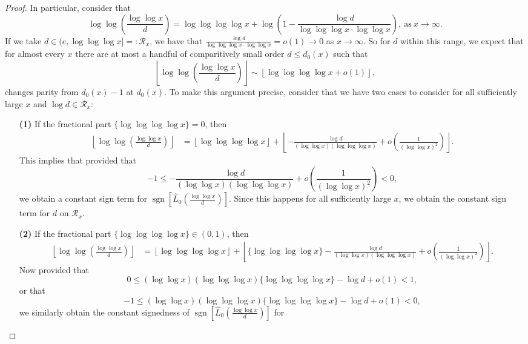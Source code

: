 \documentclass[11pt,reqno,a4letter]{article}
\numberwithin{figure}{section}
\numberwithin{table}{section}
\newcommand{\floor}[1]{\left\lfloor #1 \right\rfloor}
\theoremstyle{plain}
\numberwithin{theorem}{section}
\theoremstyle{definition}
\begin{document}
\begin{proof}
In particular, consider that 
\[
\log\log\left(\frac{\log\log x}{d}\right) = \log\log\log\log x + \log\left(1 - 
     \frac{\log d}{\log\log\log x \cdot \log\log x}\right), \mathrm{\ as\ } x \rightarrow \infty. 
\] 
If we take $d \in (e, \log\log\log x] =: \mathcal{R}_x$, we have that 
$\frac{\log d}{\log\log\log x \cdot \log\log x} = o(1) \rightarrow 0$ as $x \rightarrow \infty$. 
So for $d$ within this range, we expect that for almost every $x$ there are at most 
a handful of comparitively small order $d \leq d_0(x)$ such that 
\[
\floor{\log\log\left(\frac{\log\log x}{d}\right)} \sim \floor{\log\log\log\log x + o(1)}, 
\]
changes parity from $d_0(x)-1$ at $d_0(x)$. To make this argument precise, consider that we have two 
cases to consider for all sufficiently large $x$ and $\log d \in \mathcal{R}_x$: 
\begin{itemize}[itemsep=0pt,topsep=0pt,leftmargin=0.25in]  
\item[\textbf{(1)}] If the fractional part $\{\log\log\log\log x\} = 0$, then 
     \begin{align*} 
     \floor{\log\log\left(\frac{\log\log x}{d}\right)} & = \floor{\log\log\log\log x} + 
          \floor{-\frac{\log d}{(\log\log x)(\log\log\log x)} + o\left(\frac{1}{(\log\log x)^2}\right)}. 
     \end{align*} 
     This implies that provided that 
     \[
     -1 \leq -\frac{\log d}{(\log\log x)(\log\log\log x)} + o\left(\frac{1}{(\log\log x)^2}\right) < 0, 
     \]
     we obtain a constant sign term for $\operatorname{sgn}\left[\widehat{L}_0\left(\frac{\log\log x}{d}\right)\right]$. 
     Since this happens for all sufficiently large $x$, we obtain the constant sign term for $d$ on 
     $\mathcal{R}_x$. 
\item[\textbf{(2)}] If the fractional part $\{\log\log\log\log x\} \in (0, 1)$, then 
     \begin{align*} 
     \floor{\log\log\left(\frac{\log\log x}{d}\right)} & = \floor{\log\log\log\log x} + 
          \floor{\{\log\log\log\log x\} - \frac{\log d}{(\log\log x)(\log\log\log x)} + o\left(\frac{1}{(\log\log x)^2}\right)}. 
     \end{align*} 
     Now provided that 
     \[
     0 \leq (\log\log x)(\log\log\log x) \{\log\log\log\log x\} - \log d + o(1) < 1, 
     \] 
     or that 
     \[
     -1 \leq (\log\log x)(\log\log\log x) \{\log\log\log\log x\} - \log d + o(1) < 0, 
     \] 
     we similarly obtain the constant signedness of 
     $\operatorname{sgn}\left[\widehat{L}_0\left(\frac{\log\log x}{d}\right)\right]$ for 

\end{itemize}
\end{proof}
\end{document}
